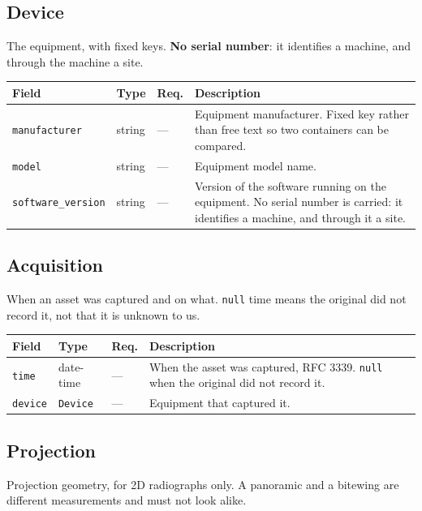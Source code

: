 \documentclass[11pt,a4paper]{article}
\newcommand{\code}[1]{\texttt{\small #1}}
\begin{document}
\subsection{Device}

The equipment, with fixed keys. \textbf{No serial number}: it identifies a machine, and through the machine a site.

\begin{longtable}{L{3.8cm} L{2.7cm} C{1.4cm} L{6.4cm}}
\toprule
\textbf{Field} & \textbf{Type} & \textbf{Req.} & \textbf{Description}\\
\midrule
\endhead
\code{manufacturer} & string & --- & Equipment manufacturer. Fixed key rather than free text so two containers can be compared.\\
\code{model} & string & --- & Equipment model name.\\
\code{software\_version} & string & --- & Version of the software running on the equipment. No serial number is carried: it identifies a machine, and through it a site.\\
\bottomrule
\end{longtable}

\subsection{Acquisition}

When an asset was captured and on what. \code{null} time means the original did not record it, not that it is unknown to us.

\begin{longtable}{L{3.5cm} L{3.0cm} C{1.4cm} L{6.4cm}}
\toprule
\textbf{Field} & \textbf{Type} & \textbf{Req.} & \textbf{Description}\\
\midrule
\endhead
\code{time} & date-time & --- & When the asset was captured, RFC 3339. \code{null} when the original did not record it.\\
\code{device} & \code{Device} & --- & Equipment that captured it.\\
\bottomrule
\end{longtable}

\subsection{Projection}

Projection geometry, for 2D radiographs only. A panoramic and a bitewing are different measurements and must not look alike.
\end{document}
